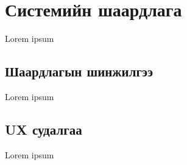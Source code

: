 \chapter{Системийн шаардлага}

Lorem ipsum

\section{Шаардлагын шинжилгээ}

Lorem ipsum

\section{UX судалгаа}

Lorem ipsum